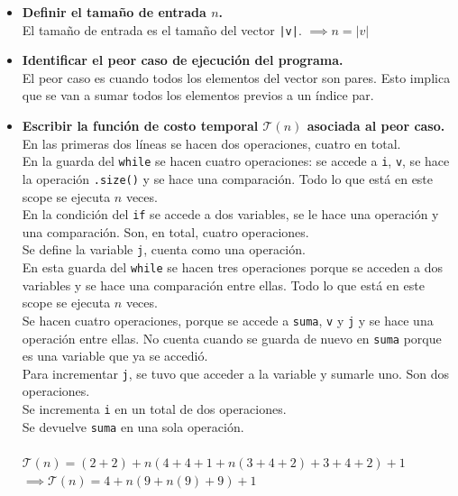 \documentclass[12 pt]{article}
\begin{document}
    \begin{itemize}
        \item \textbf{Definir el tamaño de entrada $n$.} \\
            El tamaño de entrada es el tamaño del vector \texttt{|v|}. \(\implies n = |v|\)
        \item \textbf{Identificar el peor caso de ejecución del programa.} \\
            El peor caso es cuando todos los elementos del vector son pares. Esto implica que se van a sumar todos los elementos previos a un índice par.
        \item \textbf{Escribir la función de costo temporal $\mathcal{T}(n)$ asociada al peor caso.} \\
            En las primeras dos líneas se hacen dos operaciones, cuatro en total. \\
            En la guarda del \texttt{while} se hacen cuatro operaciones: se accede a \texttt{i}, \texttt{v}, se hace la operación \texttt{.size()} y se hace una comparación. Todo lo que está en este scope se ejecuta $n$ veces.\\
                En la condición del \texttt{if} se accede a dos variables, se le hace una operación y una comparación. Son, en total, cuatro operaciones. \\
                    Se define la variable \texttt{j}, cuenta como una operación. \\
                    En esta guarda del \texttt{while} se hacen tres operaciones porque se acceden a dos variables y se hace una comparación entre ellas. Todo lo que está en este scope se ejecuta $n$ veces. \\
                        Se hacen cuatro operaciones, porque se accede a \texttt{suma}, \texttt{v} y \texttt{j} y se hace una operación entre ellas. No cuenta cuando se guarda de nuevo en \texttt{suma} porque es una variable que ya se accedió. \\
                        Para incrementar \texttt{j}, se tuvo que acceder a la variable y sumarle uno. Son dos operaciones. \\
                Se incrementa \texttt{i} en un total de dos operaciones. \\
            Se devuelve \texttt{suma} en una sola operación. \\
            \\
            \(\mathcal{T}(n) = (2+2) + n(4+4+1 + n(3+4+2)+3+4+2)+1\) \\
            \(\implies \mathcal{T}(n) = 4 + n(9 + n(9)+9)+1\) \\

\end{itemize}
\end{document}
